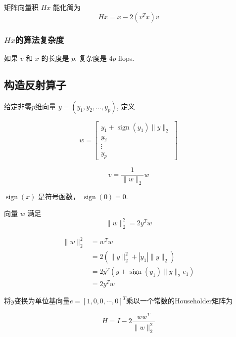 \begin{theorem}
    矩阵向量积 $ H x $ 能化简为
$$
H x=x-2\left(v^{T} x\right) v
$$
\end{theorem}


\subsubsection{$Hx$的算法复杂度}

    如果 $ v $ 和 $ x $ 的长度是 $ p $, 复杂度是 $ 4 p $ flops.


\subsection{构造反射算子}

给定非零$p$维向量 $ y=\left(y_{1}, y_{2}, \ldots, y_{p}\right) $, 定义

\begin{definition}
    $$w=\left[\begin{array}{c}
        y_{1}+\operatorname{sign}\left(y_{1}\right)\|y\|_{2} \\
        y_{2} \\
        \vdots \\
        y_{p}
        \end{array}\right]$$

    $$v=\frac{1}{\|w\|_{2}} w$$

    $\operatorname{sign}(x)$ 是符号函数， $\operatorname{sign}(0)=0$.
\end{definition}

\begin{theorem}
    向量 $ w $ 满足 $$ \|w\|_{2}^{2}=2 y^{T} w $$
\end{theorem}

$$
\begin{aligned}
    \|w\|_{2}^{2}&=w^{T} w\\
    &=2\left(\|y\|_{2}^{2}+\left|y_{1}\right|\|y\|_{2}\right)\\
    &=2 y^{T}\left(y+\operatorname{sign}\left(y_{1}\right)\|y\|_{2} e_{1}\right)\\
    &=2 y^{T} w 
\end{aligned}
$$

\begin{definition}
将$y$变换为单位基向量$e=[1,0,0,\cdots,0]^T$乘以一个常数的Householder矩阵为

    $$ H=I-2 \frac{w w^{T}}{\|w\|_{2}^{2}} $$
\end{definition}

